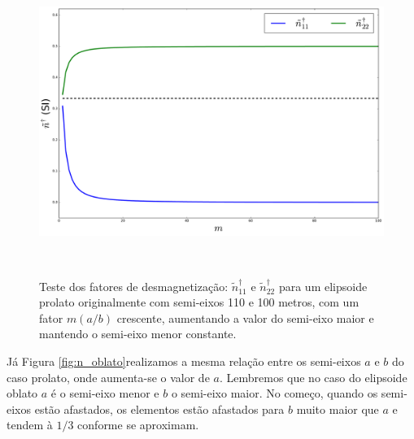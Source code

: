 \begin{figure}[hbt!]
	\centering \includegraphics[width=15cm,height=10cm]{figures/test_n_prolate}
	\caption[Teste dos fatores de desmagnetização para um elipsoide prolato.]{Teste dos fatores de desmagnetização:
		$\tilde{n}^{\dagger}_{11}$ e $\tilde{n}^{\dagger}_{22}$
		para um elipsoide prolato originalmente com semi-eixos 110 e 100 metros, com um fator $m (a/b)$ crescente,
		aumentando a valor do semi-eixo maior e mantendo o semi-eixo menor constante.}
	\label{fig:n_prolato}
\end{figure}

Já Figura \ref{fig:n_oblato}realizamos a mesma relação entre os semi-eixos $a$ e $b$ do caso prolato, onde aumenta-se o valor de $a$. Lembremos que no caso do elipsoide oblato $a$ é o semi-eixo menor e $b$ o semi-eixo maior. No começo, quando os semi-eixos estão afastados, os elementos estão afastados para $b$ muito maior que $a$ e tendem à $1/3$ conforme se aproximam.

